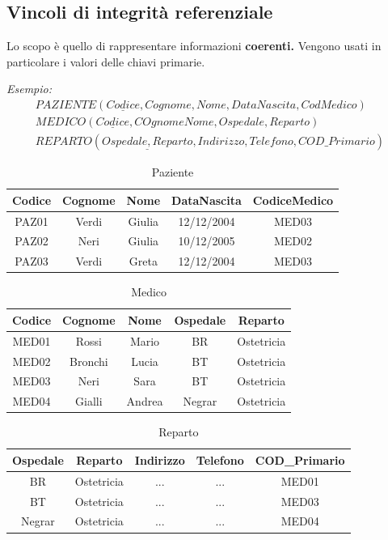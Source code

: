 \documentclass{article}
\begin{document}
\subsection{Vincoli di integrità referenziale}
Lo scopo è quello di rappresentare informazioni \textbf{coerenti.} Vengono usati in particolare i valori delle chiavi primarie.

\textit{Esempio:}
\begin{align*}
    PAZIENTE(\underline{Codice}, Cognome, Nome, DataNascita, CodMedico) \\ MEDICO(\underline{Codice}, COgnome Nome, Ospedale, Reparto) \\
    REPARTO (\underline{Ospedale, Reparto}, Indirizzo, Telefono, COD\_Primario)
\end{align*}

\begin{table}[h!]
    \centering
    \begin{tabular}{|c|c|c|c|c|}
    \hline
        \textbf{Codice}& \textbf{Cognome }& \textbf{Nome} & \textbf{DataNascita} & \textbf{ CodiceMedico} \\
        \hline
        PAZ01 & Verdi & Giulia & 12/12/2004 & MED03 \\
        \hline
        PAZ02 & Neri & Giulia & 10/12/2005 & MED02 \\
        \hline
        PAZ03 & Verdi & Greta & 12/12/2004 & MED03 \\
        \hline
    \end{tabular}
    \caption{Paziente}
\end{table}


\begin{table}[h!]
    \centering
    \begin{tabular}{|c|c|c|c|c|}
    \hline
        \textbf{Codice}&\textbf{ Cognome} &\textbf{ Nome} &\textbf{ Ospedale} & \textbf{Reparto} \\
        \hline
        MED01 & Rossi & Mario & BR & Ostetricia \\
        \hline
        MED02 & Bronchi & Lucia & BT & Ostetricia \\
        \hline
        MED03 & Neri & Sara &  BT & Ostetricia \\
        \hline
        MED04 & Gialli & Andrea & Negrar & Ostetricia \\
        \hline
    \end{tabular}
    \caption{Medico}
\end{table}

\begin{table}[h!]
    \centering
    \begin{tabular}{|c|c|c|c|c|}
    \hline
        \textbf{Ospedale} & \textbf{Reparto} & \textbf{Indirizzo} & \textbf{Telefono} & \textbf{COD\_Primario} \\
        \hline
        BR & Ostetricia & ... & ... & MED01 \\
        \hline
        BT & Ostetricia & ... & ... & MED03 \\
        \hline
        Negrar & Ostetricia & ... & ... & MED04 \\
        \hline
    \end{tabular}
    \caption{Reparto}
\end{table}
\end{document}
